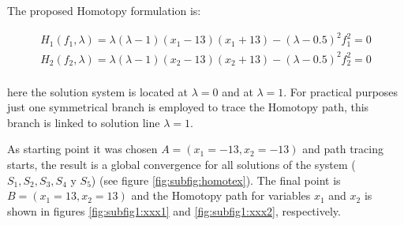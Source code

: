 \documentclass[journal,twocolumn]{IEEEtran}
\begin{document}
The proposed Homotopy formulation is:

{\tiny
\begin{displaymath}
\begin{array}{c}
H_1(f_1,\lambda)=\lambda(\lambda-1)(x_1-13)(x_1+13)-(\lambda-0.5)^2 f_1^2=0\\
H_2(f_2,\lambda)=\lambda(\lambda-1)(x_2-13)(x_2+13)-(\lambda-0.5)^2 f_2^2=0\\
\end{array}
\end{displaymath}}

here the solution system is located at $\lambda=0$ and at $\lambda=1$. For practical purposes just one symmetrical branch is employed to trace the Homotopy path, this branch is linked to solution line $\lambda=1$.

As starting point it was chosen $A=(x_1=-13,x_2=-13)$ and path tracing starts, the result is a global convergence for all solutions of the system ($S_1,S_2,S_3,S_4$ y $S_5$) (see figure \ref{fig:subfig:homotex}). The final point is $B=(x_1=13, x_2=13)$ and the Homotopy path for variables $x_1$ and $x_2$ is shown in figures \ref{fig:subfig1:xxx1} and \ref{fig:subfig1:xxx2}, respectively.
\end{document}
